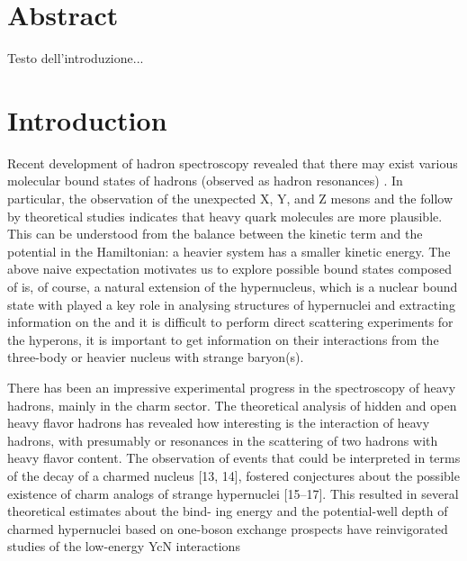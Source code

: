 \documentclass[12pt,a4paper]{book}
\begin{document}
	\tableofcontents  %
	
	\newpage
	
	\chapter{Abstract}
	Testo dell'introduzione...
	
	\newpage
	
	\chapter{Introduction}
	
	Recent development of hadron spectroscopy revealed that there may exist various molecular bound states of hadrons (observed as hadron resonances) . In particular, the observation	of the unexpected X, Y, and Z mesons and the follow by theoretical studies indicates that heavy quark molecules are more plausible. This can be understood from the balance between the kinetic term and the potential in the Hamiltonian: a heavier system has a smaller kinetic
	energy. The above naive expectation motivates us to explore possible bound states composed of
	is, of course, a natural extension of the hypernucleus, which is a nuclear bound state with
	played a key role in analysing structures of hypernuclei and extracting information on the
	and it is difficult to perform direct scattering experiments for the hyperons, it is important
	to get information on their interactions from the three-body or heavier nucleus with strange
	baryon(s).
	
	There has been an impressive experimental progress in the spectroscopy of heavy hadrons,
	mainly in the charm sector. The theoretical analysis of hidden and open heavy flavor
	hadrons has revealed how interesting is the interaction of heavy hadrons, with presumably
	or resonances in the scattering of two hadrons with heavy flavor content.  The observation of events that could be interpreted in terms of the decay of a
	charmed nucleus [13, 14], fostered conjectures about the possible existence of charm analogs
	of strange hypernuclei [15–17]. This resulted in several theoretical estimates about the bind-
	ing energy and the potential-well depth of charmed hypernuclei based on one-boson exchange
	prospects have reinvigorated studies of the low-energy YcN interactions
	
\end{document}
